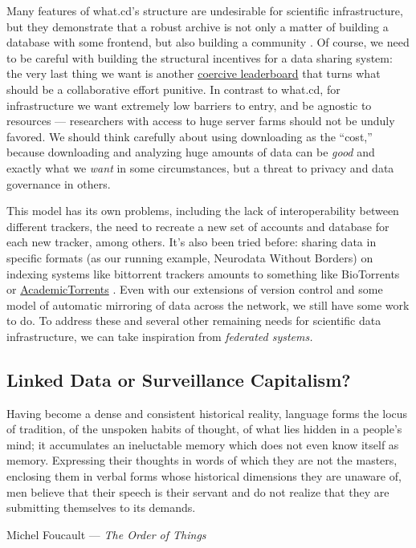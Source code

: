 Many features of what.cd's structure are undesirable for scientific
infrastructure, but they demonstrate that a robust archive is not only a
matter of building a database with some frontend, but also building a
community \citep{brossCommunityCollaborationContribution2013} . Of
course, we need to be careful with building the structural incentives
for a data sharing system: the very last thing we want is another
\href{https://etiennelebel.com/cs/t-leaderboard/t-leaderboard.html}{coercive
leaderboard} that turns what should be a collaborative effort punitive.
In contrast to what.cd, for infrastructure we want extremely low
barriers to entry, and be agnostic to resources --- researchers with
access to huge server farms should not be unduly favored. We should
think carefully about using downloading as the ``cost,'' because
downloading and analyzing huge amounts of data can be \emph{good} and
exactly what we \emph{want} in some circumstances, but a threat to
privacy and data governance in others.

This model has its own problems, including the lack of interoperability
between different trackers, the need to recreate a new set of accounts
and database for each new tracker, among others. It's also been tried
before: sharing data in specific formats (as our running example,
Neurodata Without Borders) on indexing systems like bittorrent trackers
amounts to something like BioTorrents \citep{langilleBioTorrentsFileSharing2010}  or
\href{https://academictorrents.com/}{AcademicTorrents} \citep{cohenAcademicTorrentsCommunityMaintained2014} . Even with our
extensions of version control and some model of automatic mirroring of
data across the network, we still have some work to do. To address these
and several other remaining needs for scientific data infrastructure, we
can take inspiration from \emph{federated systems.}

\hypertarget{linked-data-or-surveillance-capitalism}{%
\subsection{Linked Data or Surveillance
Capitalism?}\label{linked-data-or-surveillance-capitalism}}

\begin{leftbar}
Having become a dense and consistent historical reality, language forms
the locus of tradition, of the unspoken habits of thought, of what lies
hidden in a people's mind; it accumulates an ineluctable memory which
does not even know itself as memory. Expressing their thoughts in words
of which they are not the masters, enclosing them in verbal forms whose
historical dimensions they are unaware of, men believe that their speech
is their servant and do not realize that they are submitting themselves
to its demands.

Michel Foucault --- \emph{The Order of Things} \citep{foucaultOrderThings2001} 
\end{leftbar}

